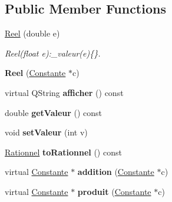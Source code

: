 \subsection*{\-Public \-Member \-Functions}
\begin{DoxyCompactItemize}
\item 
\hypertarget{class_reel_ac186094d182a46f84199deabf90cbd0e}{\hyperlink{class_reel_ac186094d182a46f84199deabf90cbd0e}{\-Reel} (double e)}\label{class_reel_ac186094d182a46f84199deabf90cbd0e}

\begin{DoxyCompactList}\small\item\em \-Reel(float e)\-:\-\_\-valeur(e)\{\}. \end{DoxyCompactList}\item 
\hypertarget{class_reel_a02f5d2d30d048ae139b1d8112f6c6f9a}{{\bfseries \-Reel} (\hyperlink{class_constante}{\-Constante} $\ast$c)}\label{class_reel_a02f5d2d30d048ae139b1d8112f6c6f9a}

\item 
\hypertarget{class_reel_a01af7b4e76fb88a85796a41f63b00420}{virtual \-Q\-String {\bfseries afficher} () const }\label{class_reel_a01af7b4e76fb88a85796a41f63b00420}

\item 
\hypertarget{class_reel_a6412ad4d84dcd302c1fae1f7ec3ede46}{double {\bfseries get\-Valeur} () const }\label{class_reel_a6412ad4d84dcd302c1fae1f7ec3ede46}

\item 
\hypertarget{class_reel_ae2ce4ae994a0fb3762eea2eb854af5cd}{void {\bfseries set\-Valeur} (int v)}\label{class_reel_ae2ce4ae994a0fb3762eea2eb854af5cd}

\item 
\hypertarget{class_reel_acd01be68d30b8eec1e411903f3051672}{\hyperlink{class_rationnel}{\-Rationnel} {\bfseries to\-Rationnel} () const }\label{class_reel_acd01be68d30b8eec1e411903f3051672}

\item 
\hypertarget{class_reel_a916d41fd6be293e13db43ef0a7866f40}{virtual \hyperlink{class_constante}{\-Constante} $\ast$ {\bfseries addition} (\hyperlink{class_constante}{\-Constante} $\ast$c)}\label{class_reel_a916d41fd6be293e13db43ef0a7866f40}

\item 
\hypertarget{class_reel_ad87571a6e4d315eef54b55e6ded1f8f5}{virtual \hyperlink{class_constante}{\-Constante} $\ast$ {\bfseries produit} (\hyperlink{class_constante}{\-Constante} $\ast$c)}\label{class_reel_ad87571a6e4d315eef54b55e6ded1f8f5}


\end{DoxyCompactItemize}
